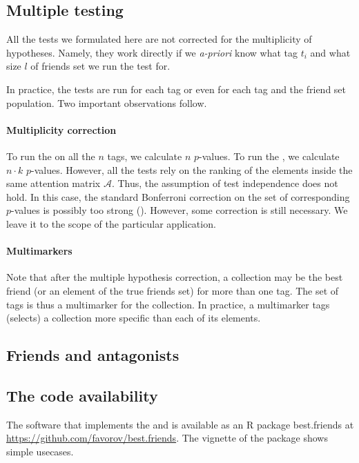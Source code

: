 \documentclass{llncs}
\begin{document}
\subsection{Multiple testing}
\label{sec:multimurkers}

All the tests we formulated here are not corrected for the multiplicity of hypotheses. Namely, they work directly if we \textit{a-priori} know what tag $t_i$ and what size $l$ of friends set we run the test for. 

In practice, the tests are run for each tag or even for each tag and the friend set population. Two important observations follow.

\paragraph*{Multiplicity correction} 
To run the  on all the $n$ tags, we 
calculate $n$ $p$-values. To run the , we calculate $n \cdot k$ $p$-values. However, all the tests rely on the ranking of the elements inside the same attention matrix $\mathcal{A}$. Thus, the assumption of test independence does not hold. In this case, the standard Bonferroni correction on the set of corresponding $p$-values is possibly too strong (\cite{cabin2000bonferroni}). However, some correction is still necessary. We leave it to the scope of the particular application.

\paragraph*{Multimarkers} Note that after the multiple hypothesis correction, a collection may be the best friend (or an element of the true friends set) for more than one tag. The set of tags is thus a multimarker for the collection. In practice, a multimarker tags (selects) a collection more specific than each of its elements.

\subsection{Friends and antagonists}

\subsection{The code availability}

The software that implements the  and  is available as an \textsf{R} package \textsf{best.friends} at 
\url{https://github.com/favorov/best.friends}. The vignette of the package shows simple usecases.
\end{document}
